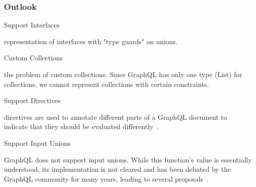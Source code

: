 \begin{frame}\frametitle{Outlook}

\begin{block}{Support Interfaces}

    representation of interfaces with "type guards" on unions. 

\end{block}




\begin{block}{Custom Collections}

the problem of custom collections. Since GraphQL has only one type (List) for collections, we cannot represent collections with certain constraints. 

\end{block}

\begin{block}{Support Directives} 

directives are used to annotate different parts of a GraphQL document to indicate that they should be evaluated differently~\cite{gql-spec}. 

\end{block}

\begin{block}{Support Input Unions} 

GraphQL does not support input unions. While this function's value is essentially understood, its implementation is not cleared and has been debated by the GraphQL community for many years, leading to several proposals~\cite{gql-spec-input-unions}. 

\end{block}

\end{frame}
